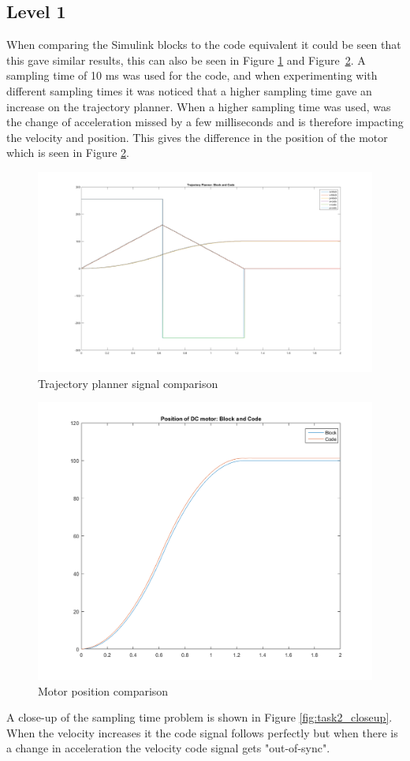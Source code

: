 \subsection*{Level 1}
When comparing the Simulink blocks to the code equivalent it could be
seen that this gave similar results, this can also be seen
in Figure \ref{fig:task2_traj} and
Figure~\ref{fig:task2_pos}. A sampling time of 10 ms was used for the
code, and when experimenting with different sampling times it was noticed that
a higher sampling time gave an increase on the trajectory planner.
When a higher sampling time was used, was the change of
acceleration missed by a few milliseconds and is therefore impacting the
velocity and position. This gives the difference in the position of the
motor which is seen in Figure \ref{fig:task2_pos}.
\begin{figure}[H]
	\begin{center}
	
		\includegraphics[width=0.45\linewidth]{task2_traj.png}
		\caption{Trajectory planner signal comparison}
		\label{fig:task2_traj}
	\end{center}
\end{figure}
\begin{figure}[H]
	\begin{center}
	
		\includegraphics[width=0.45\linewidth]{task2_position.png}
		\caption{Motor position comparison}
		\label{fig:task2_pos}
	\end{center}
\end{figure}

A close-up of the sampling time problem is shown in Figure
\ref{fig:task2_closeup}. When the velocity increases it the code signal
follows  perfectly but when there is a change in acceleration
the velocity code signal gets "out-of-sync".


